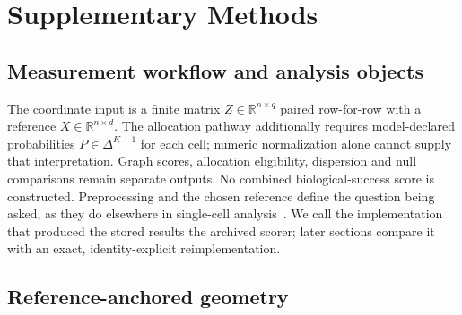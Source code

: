 \documentclass[11pt]{article}
\begin{document}
\FloatBarrier

\section*{Supplementary Methods}


\subsection{Measurement workflow and analysis objects}

The coordinate input is a finite matrix $Z\in\mathbb R^{n\times q}$ paired row-for-row with a reference $X\in\mathbb R^{n\times d}$. The allocation pathway additionally requires model-declared probabilities $P\in\Delta^{K-1}$ for each cell; numeric normalization alone cannot supply that interpretation. Graph scores, allocation eligibility, dispersion and null comparisons remain separate outputs. No combined biological-success score is constructed. Preprocessing and the chosen reference define the question being asked, as they do elsewhere in single-cell analysis~\cite{luecken2019practices}. We call the implementation that produced the stored results the archived scorer; later sections compare it with an exact, identity-explicit reimplementation.

\subsection{Reference-anchored geometry}
\end{document}
